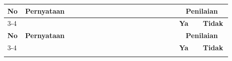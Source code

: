 \begin{longtable}{|p{0.05\linewidth}|p{0.65\linewidth}|p{0.1\linewidth}|p{0.1\linewidth}|}
      \hline
      \textbf{No} & \textbf{Pernyataan}                                                                                                                   & \multicolumn{2}{c|}{\textbf{Penilaian}}                  \\
      \cline{3-4}
                  &                                                                                                                                       & \textbf{Ya}                             & \textbf{Tidak} \\
      \hline
      \endfirsthead

      \hline
      \textbf{No} & \textbf{Pernyataan}                                                                                                                   & \multicolumn{2}{c|}{\textbf{Penilaian}}                  \\
      \cline{3-4}
                  &                                                                                                                                       & \textbf{Ya}                             & \textbf{Tidak} \\
      \hline
      \endhead

      \hline
      \endfoot

      \hline
      \endlastfoot


\end{longtable}
